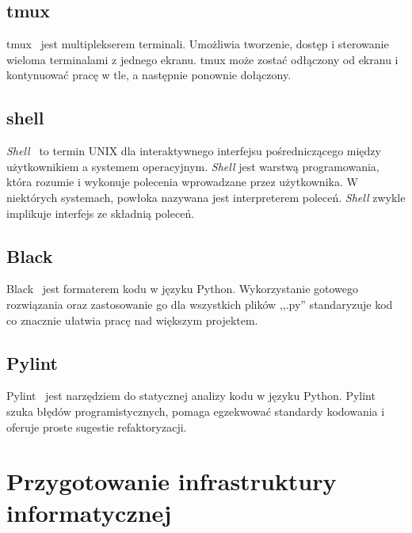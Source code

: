 	\subsection{tmux}
	tmux~\cite{tmux} jest multiplekserem terminali. Umożliwia tworzenie, dostęp i sterowanie wieloma terminalami z jednego ekranu. tmux może zostać odłączony od ekranu i kontynuować pracę w tle, a następnie ponownie dołączony.
	
	\subsection{shell}
	\textit{Shell}~\cite{shell} to termin UNIX dla interaktywnego interfejsu pośredniczącego między użytkownikiem a systemem operacyjnym. \textit{Shell} jest warstwą programowania, która rozumie i wykonuje polecenia wprowadzane przez użytkownika. W niektórych systemach, powłoka nazywana jest interpreterem poleceń. \textit{Shell} zwykle implikuje interfejs ze składnią poleceń.
	
	\subsection{Black}
	Black~\cite{black} jest formaterem kodu w języku Python. Wykorzystanie gotowego rozwiązania oraz zastosowanie go dla wszystkich plików  ,,.py'' standaryzuje kod co znacznie ułatwia pracę nad większym projektem.
	
	\subsection{Pylint}
	Pylint~\cite{pylint} jest narzędziem do statycznej analizy kodu w języku Python. Pylint szuka błędów programistycznych, pomaga egzekwować standardy kodowania i oferuje proste sugestie refaktoryzacji.

\section{Przygotowanie infrastruktury informatycznej}
